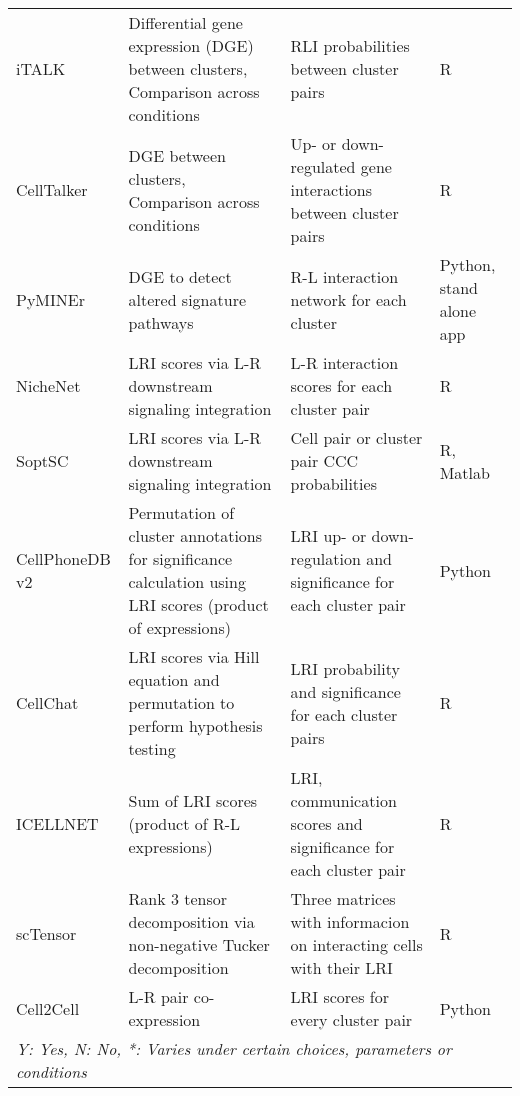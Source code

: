 {\begin{longtable}[l]{ p{2cm} p{5.5cm} p{5cm} m{2cm} }
        iTALK & Differential gene expression (DGE) between clusters, Comparison across conditions & RLI probabilities between cluster pairs & R \\[1.2cm]
        CellTalker & DGE between clusters, Comparison across conditions & Up- or down-regulated gene interactions between cluster pairs & R \\[0.7cm]
        PyMINEr & DGE to detect altered signature pathways & R-L interaction network for each cluster & Python, stand alone app \\[0.7cm]
        NicheNet & LRI scores via L-R downstream signaling integration & L-R interaction scores for each cluster pair & R \\[0.7cm]
        SoptSC & LRI scores via L-R downstream signaling integration & Cell pair or cluster pair CCC probabilities & R, Matlab \\[0.7cm]
        CellPhoneDB \newline v2 & Permutation of cluster annotations for significance calculation using LRI scores (product of expressions) & LRI up- or down-regulation and significance for each cluster pair & Python \\[1.2cm]
        CellChat & LRI scores via Hill equation and permutation to perform hypothesis testing & LRI probability and significance for each cluster pairs & R \\[0.7cm]
        ICELLNET & Sum of LRI scores (product of R-L expressions) & LRI, communication scores and significance for each cluster pair & R \\[0.7cm]
        scTensor & Rank 3 tensor decomposition via non-negative Tucker decomposition & Three matrices with informacion on interacting cells with their LRI & R \\[0.7cm]
        Cell2Cell & L-R pair co-expression & LRI scores for every cluster pair & Python \\[0.4cm]
        \multicolumn{4}{l}{\scriptsize \itshape Y: Yes, N: No, *: Varies under certain choices, parameters or conditions} \\
    \end{longtable}
}




